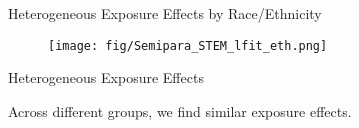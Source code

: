 \documentclass[aspectratio=169,xcolor=dvipsnames]{beamer}
\newenvironment{wideitemize}{\itemize\addtolength{\itemsep}{10pt}}{\enditemize}
\begin{document}
\begin{frame}{Heterogeneous Exposure Effects by Race/Ethnicity}

\begin{figure}[H]
    \centering
    		\texttt{[image: fig/Semipara\_STEM\_lfit\_eth.png]}
    \end{figure}
\end{frame}



\begin{frame}{Heterogeneous Exposure Effects}\label{}
    \begin{table}[!htbp]
	\centering \footnotesize
	\captionsetup{width=1.0\textwidth}
\end{table}
Across different groups, we find similar exposure effects.
\end{frame}
\end{document}
